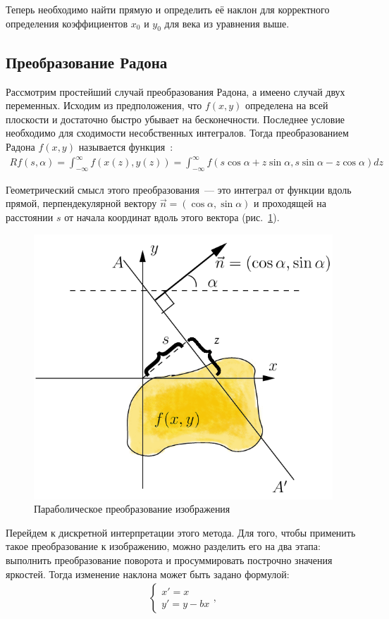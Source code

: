 \documentclass[12pt]{article} %
\begin{document}
Теперь необходимо найти прямую и определить её наклон для корректного определения коэффициентов $x_0$ и $y_0$ для века из уравнения выше.
 
\newpage
\subsection{Преобразование Радона}

Рассмотрим простейший случай преобразования Радона, а имеено случай двух переменных. Исходим из предположения, что $f(x,y)$ определена на всей плоскости и достаточно быстро убывает на бесконечности. Последнее условие необходимо для сходимости несобственных интегралов. Тогда преобразованием Радона $f(x,y)$ называется функция~\cite{Radon}:
\begin{gather}\label{radon}
	Rf(s, \alpha) = \int_{-\infty}^{\infty}{f(x(z),y(z))} = \int_{-\infty}^{\infty}{f(s\cos{\alpha}+z\sin{\alpha}, s\sin{\alpha}-z\cos{\alpha})dz}
\end{gather}

Геометрический смысл этого преобразования~--- это интеграл от функции вдоль прямой, перпендекулярной вектору $\vec{n}=(\cos{\alpha}, \sin{\alpha})$ и проходящей на расстоянии $s$ от начала координат вдоль этого вектора (рис.~\ref{fig:Radon_transform}).
\begin{figure}[h]
	
	\centering
	
	\includegraphics[width=0.5\linewidth]{Radon_transform.jpg}
	
	\caption{Параболическое преобразование изображения}
	
	\label{fig:Radon_transform}
	
\end{figure}

Перейдем к дискретной интерпретации этого метода. Для того, чтобы применить такое преобразование к изображению, можно разделить его на два этапа: выполнить преобразование поворота и просуммировать построчно значения яркостей. Тогда изменение наклона может быть задано формулой:
\begin{gather}\label{nakl}
	\begin{cases}
		x' = x
		\\
		y' = y - bx
	\end{cases},
\end{gather}
\end{document}
